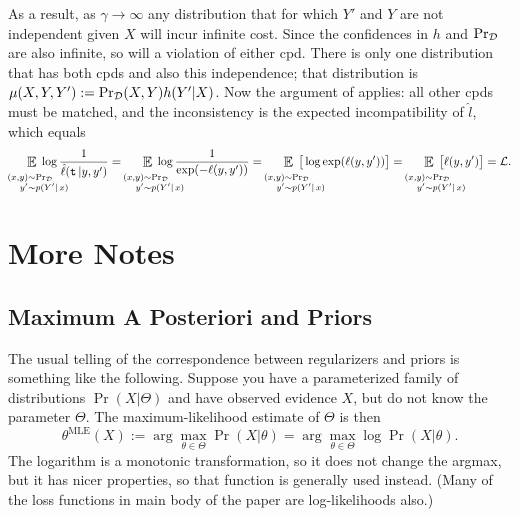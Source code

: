 \documentclass[twoside]{article}
\theoremstyle{plain}
\theoremstyle{definition}
\DeclareMathOperator*{\Ex}{\mathbb{E}} %
\newcommand{\datadist}[1]{\Pr\nolimits_{#1}}
\begin{document}
{As a result, as $\gamma\to\infty$ any distribution that for which  $Y'$ and $Y$ are not independent given $X$ will incur infinite cost. Since the confidences in $h$ and $\datadist\xysamp$ are also infinite, so will a violation of either cpd.
There is only one distribution that has both cpds and also this independence; that distribution is $\mu(X,Y,Y') := \datadist\xysamp(X,Y)h(Y'|X)$.
Now the argument of  applies: all other cpds must be matched, and the inconsistency is the expected incompatibility of $\hat l$, which equals
\[ \quad\;\;\mathop{\scalebox{1.2}{$\Ex$}}\limits_{\substack{%
	\vphantom{x}\\
	\mathllap{(x,y)} \sim \mathrlap{\datadist\xysamp} \\
	\mathllap{y'} \sim \mathrlap{p(Y'|\,x)}} }
 \; \log\frac{1}{\hat\ell(\trut\,|y,y')}
 =
 \quad\;\;\mathop{\scalebox{1.2}{$\Ex$}}\limits_{\substack{%
 	\vphantom{x}\\
 	\mathllap{(x,y)} \sim \mathrlap{\datadist\xysamp} \\
 	\mathllap{y'} \sim \mathrlap{p(Y'|\,x)}} }
  \;  \log\frac{1}{\exp(-\ell(y,y'))}
 =
 \quad\;\;\mathop{\scalebox{1.2}{$\Ex$}}\limits_{\substack{%
 	\vphantom{x}\\
 	\mathllap{(x,y)} \sim \mathrlap{\datadist\xysamp} \\
 	\mathllap{y'} \sim \mathrlap{p(Y'|\,x)}} }
  \;\big[ \log \exp(\ell(y,y')) \big]
 =
 \quad\;\;\mathop{\scalebox{1.2}{$\Ex$}}\limits_{\substack{%
	 \vphantom{x}\\
	 \mathllap{(x,y)} \sim \mathrlap{\datadist\xysamp} \\
	 \mathllap{y'} \sim \mathrlap{p(Y'|\,x)}} }
  \;\big[\ell(y,y')\big]
  = \mathcal L
 .
 \]

\section{More Notes}
\subsection{Maximum A Posteriori and Priors}

The usual telling of the correspondence between regularizers and priors is something like the following.
Suppose you have a parameterized family of distributions
$\Pr(X|\Theta)$
and have observed evidence $X$, but do not know the parameter $\Theta$.
The maximum-likelihood estimate of $\Theta$ is then
\[
	\theta^{\mathrm{MLE}}(X) := \arg\max_{\theta\in \Theta}  \Pr(X|\theta)
		= \arg\max_{\theta\in \Theta} \log \Pr(X|\theta).
\]
The logarithm is a monotonic transformation, so it does not change the argmax, but it has
nicer properties, so that function is generally used instead. (Many of the loss functions in main body of the paper are log-likelihoods also.)

}
\end{document}
